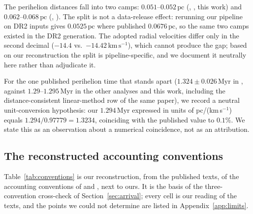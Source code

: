 \documentclass[11pt]{article}
\newcommand{\Myr}{\,\mathrm{Myr}}
\newcommand{\pc}{\,\mathrm{pc}}
\newcommand{\kms}{\,\mathrm{km\,s^{-1}}}
\begin{document}
The perihelion distances fall into two camps: $0.051$--$0.052\pc$
(\cite{dlfm22}, \cite{bb22}, this work) and $0.062$--$0.068\pc$
(\cite{bj22}, \cite{fp26}). The split is not a data-release effect:
rerunning our pipeline on DR2 inputs gives $0.0525\pc$ where \cite{bj18}
published $0.0676\pc$, so the same two camps existed in the DR2 generation.
The adopted radial velocities differ only in the second decimal
($-14.4$ vs.\ $-14.42\kms$), which cannot produce the gap; based on our
reconstruction the split is pipeline-specific, and we document it neutrally
here rather than adjudicate it.

For the one published perihelion time that stands apart
($1.324\pm0.026\Myr$ in \cite{bb22}, against $1.29$--$1.295\Myr$ in the
other analyses and this work, including the distance-consistent linear-method
row of the same paper), we record a neutral unit-conversion hypothesis: our
$1.294\Myr$ expressed in units of pc/(km\,s$^{-1}$) equals
$1.294/0.97779=1.3234$, coinciding with the published value to $0.1\%$. We
state this as an observation about a numerical coincidence, not as an
attribution.

\subsection{The reconstructed accounting conventions}\label{app:acctab}
Table~\ref{tab:conventions} is our reconstruction, from the published
texts, of the accounting conventions of \cite{bj18} and \cite{fp26}, next
to ours. It is the basis of the three-convention cross-check of
Section~\ref{sec:arrival}; every cell is our reading of the texts, and the
points we could not determine are listed in
Appendix~\ref{app:limits}.
\end{document}

